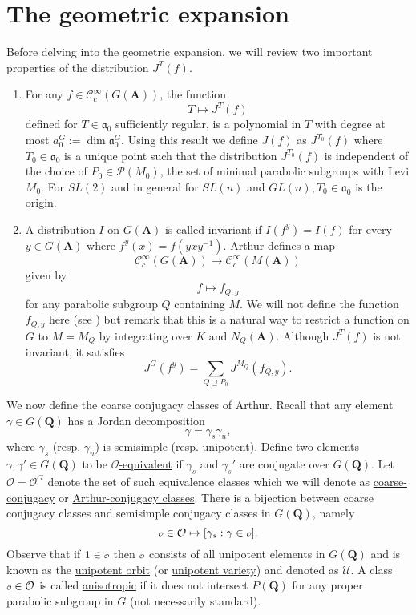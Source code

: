 \documentclass{ims9x6}
\def\A{\mathbf A}
\def\Q{\mathbf Q}
\def\CCC{\mathcal C}
\def\PPP{\mathcal P}
\def\O{\mathcal O}
\def\o{\scalebox{0.7}{$\scriptstyle\mathcal{O}$}}
\def\UUU{\mathcal U}
\def\aaa{\mathfrak a}
\def\dim{\operatorname{dim}}
\begin{document}
\section{The geometric expansion} \label{sec:geom}

Before delving into the geometric expansion, we will review two important properties of the distribution $J^T(f)$. 
\begin{enumerate}
	\item For any $f \in \CCC_c^\infty(G(\A))$, the function
		\[ T \mapsto J^T(f) \]
		defined for $T \in \aaa_0$ sufficiently regular, is a polynomial in $T$ with degree at most $a_0^G := \dim \aaa_0^G$. Using this result we define $J(f)$ as $J^{T_0}(f)$ where $T_0 \in \aaa_0$ is a unique point such that the distribution $J^{T_0}(f)$ is independent of the choice of $P_0 \in \PPP(M_0)$, the set of minimal parabolic subgroups with Levi $M_0$. For $SL(2)$ and in general for $SL(n)$ and $GL(n), T_0 \in \aaa_0$ is the origin.
		
	\item A distribution $I$ on $G(\A)$ is called \underline{invariant} if $I(f^y) = I(f)$ for every $y \in G(\A)$ where $f^y(x) = f(yxy^{-1})$. Arthur defines a map
	\[ \CCC_c^\infty(G(\A)) \to \CCC_c^\infty(M(\A)) \]
	given by
	\[ f \mapsto f_{Q, y} \]
	for any parabolic subgroup $Q$ containing $M$. We will not define the function $f_{Q, y}$ here (see \cite[Theorem~9.4]{clay}) but remark that this is a natural way to restrict a function on $G$ to $M = M_Q$ by integrating over $K$ and $N_Q(\A)$. Although $J^T(f)$ is not invariant, it satisfies
	\[ J^G(f^y) = \sum_{Q \supseteq P_0} J^{M_Q}(f_{Q, y}). \]
\end{enumerate}

We now define the coarse conjugacy classes of Arthur. Recall that any element $\gamma \in G(\Q)$ has a Jordan decomposition
\[ \gamma = \gamma_s \gamma_u, \]
where $\gamma_s$ (resp. $\gamma_u$) is semisimple (resp. unipotent). Define two elements $\gamma, \gamma' \in G(\Q)$ to be \underline{$\O$-equivalent} if $\gamma_s$ and $\gamma_s'$ are conjugate over $G(\Q)$. Let $\O = \O^G$ denote the set of such equivalence classes which we will denote as \underline{coarse-conjugacy} or \underline{Arthur-conjugacy classes}. There is a bijection between coarse conjugacy classes and semisimple conjugacy classes in $G(\Q)$, namely 
\[ \o \in \O \mapsto [\gamma_s : \gamma \in \o ]. \]
Observe that if $1 \in \o$ then $\o$ consists of all unipotent elements in $G(\Q)$ and is known as the \underline{unipotent orbit} (or \underline{unipotent variety}) and denoted as $\UUU$. A class $\o \in \O$ is called \underline{anisotropic} if it does not intersect $P(\Q)$ for any proper parabolic subgroup in $G$ (not necessarily standard). 
\end{document}
